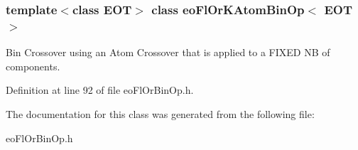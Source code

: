 \subsubsection*{template$<$class EOT$>$ class eo\-Fl\-Or\-KAtom\-Bin\-Op$<$ EOT $>$}

Bin Crossover using an Atom Crossover that is applied to a FIXED NB of components. 



Definition at line 92 of file eo\-Fl\-Or\-Bin\-Op.h.

The documentation for this class was generated from the following file:\begin{CompactItemize}
\item 
eo\-Fl\-Or\-Bin\-Op.h\end{CompactItemize}
